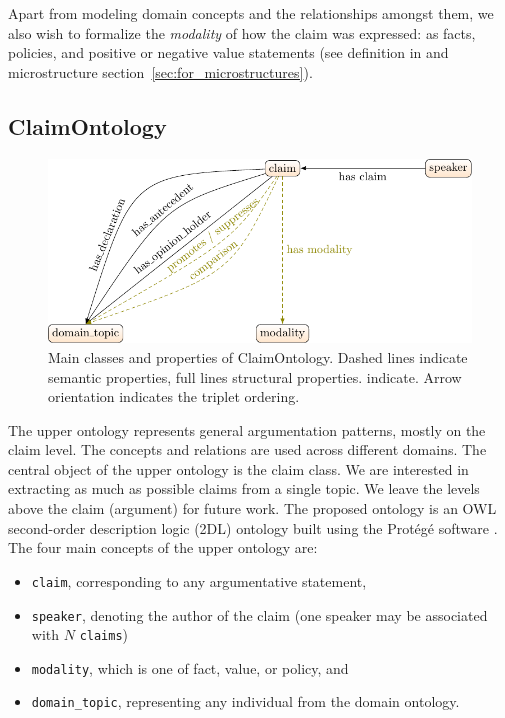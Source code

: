 Apart from modeling domain concepts and the relationships amongst them, we also
wish to formalize the \emph{modality} of how the claim was expressed: as facts,
policies, and positive or negative value statements (see definition in
\citep{rieke1997argumentation} and microstructure
section~\ref{sec:for_microstructures}). 

\subsection{ClaimOntology}
\label{subsec:claimontology}

\begin{figure}
	\centering
	\footnotesize
	\includegraphics{formalizations_main_classes-figure0.pdf}
\caption{Main classes and properties of ClaimOntology. Dashed lines indicate
	semantic properties, full lines structural properties. 
	indicate. Arrow orientation indicates the
	triplet ordering. }
\label{fig:claimontology}
\end{figure}

The upper ontology represents general argumentation patterns, mostly on the
claim level.  The concepts and relations are used across different domains.
The central object of the upper ontology is the claim class. We are interested
in extracting as much as possible claims from a single topic. We leave the
levels above the claim (argument) for future work. The proposed ontology is an
OWL second-order description logic (2DL) ontology built using the
Prot\'{e}g\'{e} software \citep{gennari2003evolution}. The four main concepts
of the upper ontology are:
\begin{itemize}
	\item \texttt{claim}, corresponding to any argumentative statement,
	\item \texttt{speaker},  denoting the author of the claim
		(one speaker may be associated with $N$ \texttt{claims})
	\item \texttt{modality}, which is one of fact, value, or policy, and
	\item \texttt{domain\_topic}, representing any individual from the domain ontology.
\end{itemize}

